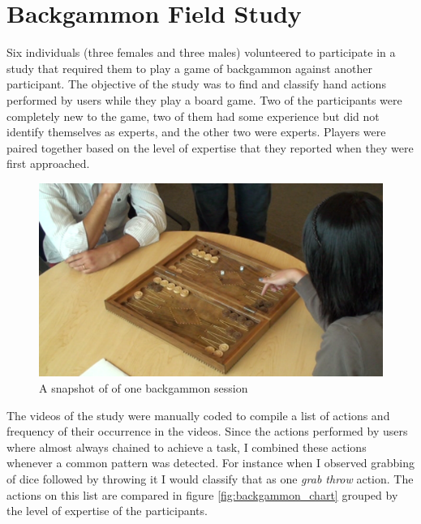\section{Backgammon Field Study}
Six individuals (three females and three males) volunteered to participate in a study that required them to play a game of backgammon against another participant.
The objective of the study was to find and classify hand actions performed by users while they play a board game. 
Two of the participants were completely new to the game, two of them had some experience but did not identify themselves as experts, and the other two were experts. 
Players were paired together based on the level of expertise that they reported when they were first approached.
\begin{figure}[h]
 \centering
 \includegraphics[type=pdf,ext=.pdf,read=.pdf,width=5in]{./img/backgammon_snapshot}
 \caption{ A snapshot of of one backgammon session }
 \label{fig:backgammon_snapshot}
\end{figure}
The videos of the study were manually coded to compile a list of actions and frequency of their occurrence in the videos.
Since the actions performed by users where almost always chained to achieve a task, I combined these actions whenever a common pattern was detected.
For instance when I observed grabbing of dice followed by throwing it I would classify that as one \textit{grab throw} action.
The actions on this list are compared in figure \ref{fig:backgammon_chart} grouped by the level of expertise of the participants.
